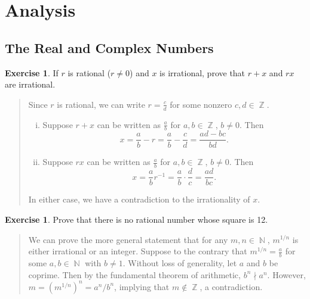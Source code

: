 \documentclass{article}
\theoremstyle{definition}
\newtheorem{exercise}[theorem]{Exercise}
\DeclareMathOperator{\N}{\mathbb{N}}
\DeclareMathOperator{\Z}{\mathbb{Z}}
\begin{document}
\section*{Analysis}
\subsection*{The Real and Complex Numbers}

\begin{exercise}
    If \(r\) is rational (\(r\neq0\)) and \(x\) is irrational, prove that \(r+x\) and \(rx\) are irrational.
\end{exercise}
\begin{quote}
    Since \(r\) is rational, we can write \(r=\frac{c}{d}\) for some nonzero \(c,d\in\Z\).
    \begin{enumerate}[(i)]
        \item Suppose \(r+x\) can be written as \(\frac{a}{b}\) for \(a,b\in\Z\), \(b\neq0\). Then 
        \[x=\frac{a}{b}-r=\frac{a}{b}-\frac{c}{d}=\frac{ad-bc}{bd}.\]
        \item Suppose \(rx\) can be written as \(\frac{a}{b}\) for \(a,b\in\Z\), \(b\neq0\). Then
        \[x=\frac{a}{b}r^{-1}=\frac{a}{b}\cdot\frac{d}{c}=\frac{ad}{bc}.\]
    \end{enumerate}
    In either case, we have a contradiction to the irrationality of \(x\).
\end{quote}

\begin{exercise}
    Prove that there is no rational number whose square is 12.
\end{exercise}
\begin{quote}
    We can prove the more general statement that for any \(m,n\in\N\), \(m^{1/n}\) is either irrational or an integer. Suppose to the contrary that \(m^{1/n}=\frac{a}{b}\) for some \(a,b\in\N\) with \(b\neq1\). Without loss of generality, let \(a\) and \(b\) be coprime. Then by the fundamental theorem of arithmetic, \(b^n\nmid a^n\). However, \(m=(m^{1/n})^n=a^n/b^n\), implying that \(m\not\in\Z\), a contradiction.    
\end{quote}
\end{document}
